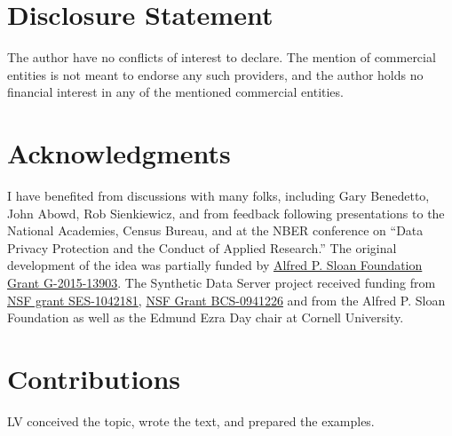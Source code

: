 \documentclass[12pt]{article}
\providecommand{\DIFaddtex}[1]{{\protect\color{blue}\uwave{#1}}} %
\providecommand{\DIFaddbegin}{} %
\providecommand{\DIFaddend}{} %
\providecommand{\DIFdelbegin}{} %
\providecommand{\DIFdelend}{} %
\providecommand{\DIFadd}[1]{\texorpdfstring{\DIFaddtex{#1}}{#1}} %
\newcommand{\DIFscaledelfig}{0.5}
\newlength{\DIFdelgraphicswidth} %
\newlength{\DIFdelgraphicsheight} %
\newcommand{\DIFaddincludegraphics}[2][]{{\color{blue}\fbox{\DIFOincludegraphics[#1]{#2}}}} %
\newcommand{\DIFdelincludegraphics}[2][]{%
\sbox{\DIFdelgraphicsbox}{\DIFOincludegraphics[#1]{#2}}%
\settoboxwidth{\DIFdelgraphicswidth}{\DIFdelgraphicsbox} %
\settoboxtotalheight{\DIFdelgraphicsheight}{\DIFdelgraphicsbox} %
\scalebox{\DIFscaledelfig}{%
\parbox[b]{\DIFdelgraphicswidth}{\usebox{\DIFdelgraphicsbox}\\[-\baselineskip] \rule{\DIFdelgraphicswidth}{0em}}\llap{\resizebox{\DIFdelgraphicswidth}{\DIFdelgraphicsheight}{%
\setlength{\unitlength}{\DIFdelgraphicswidth}%
\begin{picture}(1,1)%
\thicklines\linethickness{2pt} %
{\color[rgb]{1,0,0}\put(0,0){\framebox(1,1){}}}%
{\color[rgb]{1,0,0}\put(0,0){\line( 1,1){1}}}%
{\color[rgb]{1,0,0}\put(0,1){\line(1,-1){1}}}%
\end{picture}%
}\hspace*{3pt}}} %
} %
\DeclareRobustCommand{\DIFaddbegin}{\DIFOaddbegin \let\includegraphics\DIFaddincludegraphics} %
\DeclareRobustCommand{\DIFaddend}{\DIFOaddend \let\includegraphics\DIFOincludegraphics} %
\DeclareRobustCommand{\DIFdelbegin}{\DIFOdelbegin \let\includegraphics\DIFdelincludegraphics} %
\DeclareRobustCommand{\DIFdelend}{\DIFOaddend \let\includegraphics\DIFOincludegraphics} %
\begin{document}
\section*{Disclosure Statement}
The author have no conflicts of interest to declare. The mention of commercial entities is not meant to endorse any such providers, and the author holds no financial interest in any of the mentioned commercial entities.

\section*{Acknowledgments}

I have benefited from discussions with many folks, including Gary Benedetto, John Abowd, Rob Sienkiewicz, and from feedback following presentations to the National Academies, Census Bureau, and at the NBER conference on ``Data Privacy Protection and the Conduct of Applied Research.'' The original development of the idea was partially funded by \DIFdelbegin %
\DIFdelend \DIFaddbegin \href{https://sloan.org/grant-detail/g-2015-13903}{\DIFaddend Alfred P. Sloan Foundation Grant G-2015-13903}. The Synthetic Data Server project received funding from \href{https://www.nsf.gov/awardsearch/showAward?AWD_ID=1042181}{NSF grant SES-1042181}, \href{https://www.nsf.gov/awardsearch/showAward?AWD_ID=0941226}{NSF Grant BCS-0941226} and from the Alfred P. Sloan Foundation \DIFaddbegin \DIFadd{(}\href{https://sloan.org/grant-detail/g-2015-13903}{\DIFadd{G-2015-13903}}\DIFadd{) }\DIFaddend as well as the  Edmund Ezra Day chair at Cornell University.

\section*{Contributions}

LV conceived the topic, wrote the text, and prepared the examples.






\DIFdelbegin %
\DIFdelend \DIFaddbegin 
\DIFaddend 
\end{document}
